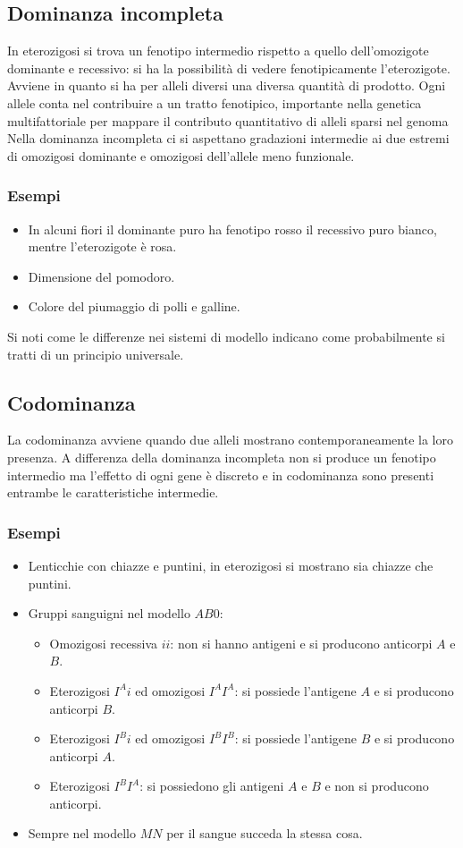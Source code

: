 \subsection{Dominanza incompleta}
In eterozigosi si trova un fenotipo intermedio rispetto a quello dell'omozigote dominante e recessivo: si ha la possibilit\`a di vedere fenotipicamente l'eterozigote.  Avviene in quanto
si ha per alleli diversi una diversa quantit\`a di prodotto. Ogni allele conta nel contribuire a un tratto fenotipico, importante nella genetica multifattoriale per mappare il contributo
quantitativo di alleli sparsi nel genoma  Nella dominanza incompleta ci si aspettano gradazioni intermedie ai due estremi di omozigosi dominante e omozigosi dell'allele meno funzionale. 
\subsubsection{Esempi}
\begin{itemize}
	\item In alcuni fiori il dominante puro ha fenotipo rosso il recessivo puro bianco, mentre l'eterozigote \`e rosa.
	\item Dimensione del pomodoro.
	\item Colore del piumaggio di polli e galline.
\end{itemize}
Si noti come le differenze nei sistemi di modello indicano come probabilmente si tratti di un principio universale. 
\subsection{Codominanza}
La codominanza avviene quando due alleli mostrano contemporaneamente la loro presenza. A differenza della dominanza incompleta non si produce un fenotipo intermedio ma l'effetto di 
ogni gene \`e discreto e in codominanza sono presenti entrambe le caratteristiche intermedie.
\subsubsection{Esempi}
\begin{itemize}
	\item Lenticchie con chiazze e puntini, in eterozigosi si mostrano sia chiazze che puntini. 
	\item Gruppi sanguigni nel modello $AB0$: 
		\begin{itemize}
			\item Omozigosi recessiva $ii$: non si hanno antigeni e si producono anticorpi $A$ e $B$.
			\item Eterozigosi $I^Ai$ ed omozigosi $I^AI^A$: si possiede l'antigene $A$ e si producono anticorpi $B$.
			\item Eterozigosi $I^Bi$ ed omozigosi $I^BI^B$: si possiede l'antigene $B$ e si producono anticorpi $A$.
			\item Eterozigosi $I^BI^A$: si possiedono gli antigeni $A$ e $B$ e non si producono anticorpi.
		\end{itemize}
	\item Sempre nel modello $MN$ per il sangue succeda la stessa cosa. 
\end{itemize}
